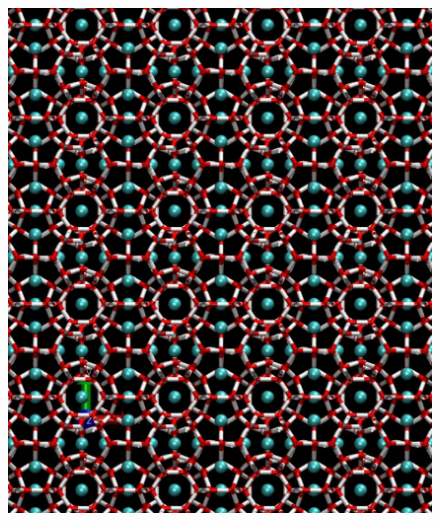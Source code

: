 \documentclass[utf8x, notes, graphics]{beamer}
\begin{document}
\begin{frame}
{
}
{
	\begin{figure}
		\includegraphics[height=0.8\textheight]{../snapshots/bulk_hydrate.pdf}
	\end{figure}
}
\end{frame}
\end{document}
